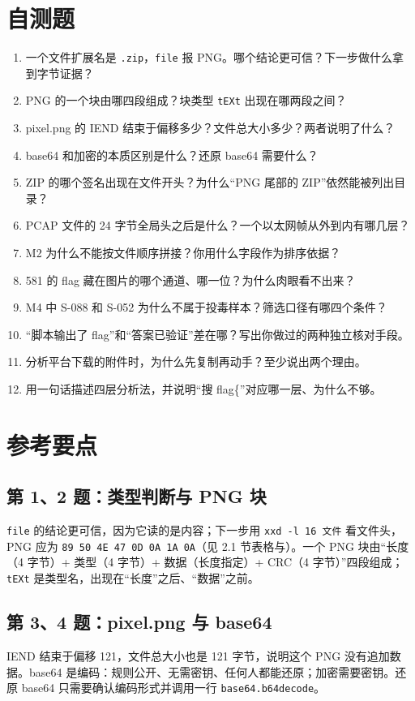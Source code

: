 \documentclass[UTF8,12pt,oneside]{ctexbook}
\begin{document}
\section{自测题}
\begin{enumerate}[label=\arabic*.]
\item 一个文件扩展名是 \verb|.zip|，\verb|file| 报 PNG。哪个结论更可信？下一步做什么拿到字节证据？
\item PNG 的一个块由哪四段组成？块类型 \verb|tEXt| 出现在哪两段之间？
\item pixel.png 的 IEND 结束于偏移多少？文件总大小多少？两者说明了什么？
\item base64 和加密的本质区别是什么？还原 base64 需要什么？
\item ZIP 的哪个签名出现在文件开头？为什么“PNG 尾部的 ZIP”依然能被列出目录？
\item PCAP 文件的 24 字节全局头之后是什么？一个以太网帧从外到内有哪几层？
\item M2 为什么不能按文件顺序拼接？你用什么字段作为排序依据？
\item 581 的 flag 藏在图片的哪个通道、哪一位？为什么肉眼看不出来？
\item M4 中 S-088 和 S-052 为什么不属于投毒样本？筛选口径有哪四个条件？
\item “脚本输出了 flag”和“答案已验证”差在哪？写出你做过的两种独立核对手段。
\item 分析平台下载的附件时，为什么先复制再动手？至少说出两个理由。
\item 用一句话描述四层分析法，并说明“搜 flag\{”对应哪一层、为什么不够。
\end{enumerate}

\section{参考要点}
\subsection*{第 1、2 题：类型判断与 PNG 块}
\verb|file| 的结论更可信，因为它读的是内容；下一步用 \verb|xxd -l 16 文件| 看文件头，PNG 应为 \verb|89 50 4E 47 0D 0A 1A 0A|（见 2.1 节表格与）。一个 PNG 块由“长度（4 字节）+ 类型（4 字节）+ 数据（长度指定）+ CRC（4 字节）”四段组成；\verb|tEXt| 是类型名，出现在“长度”之后、“数据”之前。

\subsection*{第 3、4 题：pixel.png 与 base64}
IEND 结束于偏移 121，文件总大小也是 121 字节，说明这个 PNG 没有追加数据。base64 是编码：规则公开、无需密钥、任何人都能还原；加密需要密钥。还原 base64 只需要确认编码形式并调用一行 \verb|base64.b64decode|。
\end{document}
